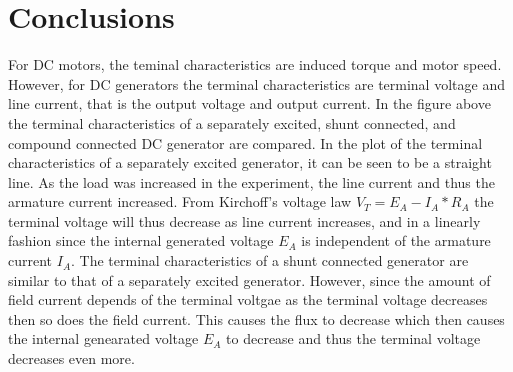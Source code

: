 \documentclass{article}
\begin{document}
\section*{Conclusions}

For DC motors, the teminal characteristics are induced torque and motor speed. However, for DC generators the 
terminal characteristics are terminal voltage and line current, that is the output voltage and output current. 
In the figure above the terminal characteristics of a separately excited, shunt connected, and compound connected
DC generator are compared. In the plot of the terminal characteristics of a separately excited generator, it can 
be seen to be a straight line. As the load was increased in the experiment, the line current and thus the armature
current increased. From Kirchoff's voltage law $V_T = E_A - I_A*R_A$ the terminal voltage will thus decrease as
line current increases, and in a linearly fashion since the internal generated voltage $E_A$ is independent of the 
armature current $I_A$. The terminal characteristics of a shunt connected generator are similar to that of a 
separately excited generator. However, since the amount of field current depends of the terminal voltgae as the 
terminal voltage decreases then so does the field current. This causes the flux to decrease which then causes the 
internal genearated voltage $E_A$ to decrease and thus the terminal voltage decreases even more. 
\end{document}
